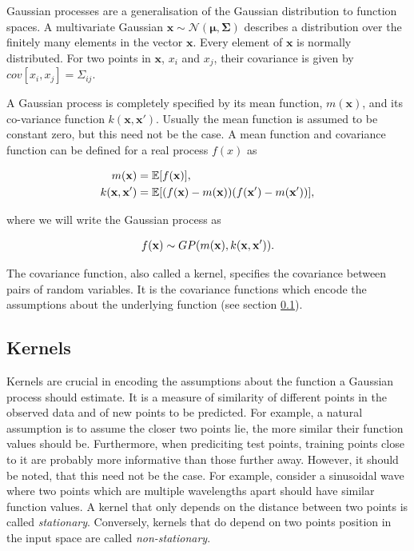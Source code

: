 \documentclass[12pt,a4paper]{report}
\theoremstyle{definition}
\begin{document}
Gaussian processes are a generalisation of the Gaussian distribution to function spaces. 
A multivariate Gaussian $\textbf{x} \sim \mathcal{N} (\boldsymbol{\mu}, \boldsymbol{\Sigma})$ describes a distribution over the finitely many elements in the vector $\textbf{x}$. 
Every element of $\textbf{x}$ is normally distributed. 
For two points in $\textbf{x}$, $x_{i}$ and $x_{j}$, their covariance is given by $cov[x_{i}, x_{j}] = \Sigma_{ij}$.

A Gaussian process is completely specified by its mean function, $m(\textbf{x})$, and its co-variance function $k(\textbf{x}, \textbf{x}')$.
Usually the mean function is assumed to be constant zero, but this need not be the case.
A mean function and covariance function can be defined for a real process $f(x)$ as 

\begin{equation}
	\begin{aligned}
		\centering
		m(\textbf{x}) &= \mathbb{E}[f(\textbf{x})],\\
		k(\textbf{x}, \textbf{x}') &= \mathbb{E}[(f(\textbf{x}) - m(\textbf{x}))(f(\textbf{x}') - m(\textbf{x}'))],
	\end{aligned}
\end{equation}

where we will write the Gaussian process as 

\begin{equation}
	\centering
	f(\textbf{x}) \sim GP(m(\textbf{x}), k(\textbf{x}, \textbf{x}')).
\end{equation}

The covariance function, also called a kernel, specifies the covariance between pairs of random variables. It is the covariance functions which encode the assumptions about the underlying function (see section \ref{sec:Kernels}).

\subsection{Kernels} \label{sec:Kernels}

Kernels are crucial in encoding the assumptions about the function a Gaussian process should estimate. 
It is a measure of similarity of different points in the observed data and of new points to be predicted. 
For example, a natural assumption is to assume the closer two points lie, the more similar their function values should be. 
Furthermore, when prediciting test points, training points close to it are probably more informative than those further away. 
However, it should be noted, that this need not be the case. 
For example, consider a sinusoidal wave where two points which are multiple wavelengths apart should have similar function values.
A kernel that only depends on the distance between two points is called \emph{stationary}.
Conversely, kernels that do depend on two points position in the input space are called \emph{non-stationary}.
\end{document}
